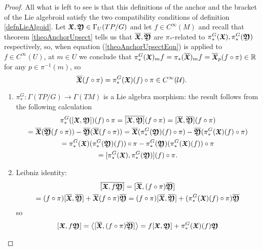 \begin{proof}
All what is left to see is that this definitions of the anchor and the bracket of the Lie algebroid satisfy the two compatibility conditions of definition \ref{defnLieAlgoid}. Let $\bm{\mathfrak{X}}, \bm{\mathfrak{Y}} \in \Gamma_U(TP/G)$ and let $f \in C^{\infty}(M)$ and recall that theorem \ref{theoAnchorUpsect} tells us that $\overline{\bm{\bm{\mathfrak{X}}}}, \overline{\bm{\bm{\mathfrak{Y}}}}$ are $\pi_*$-related to $\pi_*^G(\bm{\mathfrak{X}}), \pi_*^G(\bm{\mathfrak{Y}})$ respectively, so, when equation (\ref{theoAnchorUpsectEqn}) is applied to $f \in C^\infty(U)$, at $m\in U$ we conclude that 
    $\pi_*^G(\bm{\mathfrak{X}})_mf = \pi_*(\overline{\bm{\bm{\mathfrak{X}}}})_m f = \overline{\bm{\bm{\mathfrak{X}}}}_p(f \circ \pi) \in \mathbb{R}$ for any $p \in \pi^{-1}(m)$, so 
    \begin{equation}
        \overline{\bm{\bm{\mathfrak{X}}}}(f \circ \pi) = \pi_*^G(\bm{\mathfrak{X}})(f) \circ \pi \in C^\infty(\mathcal U).
    \end{equation}

    \begin{enumerate}
    
    \item $\pi_*^G: \Gamma(TP/G) \to \Gamma(TM)$ is a Lie algebra morphism: the result follows from the following calculation
    \begin{multline*}
        \pi_*^G([\bm{\mathfrak{X}}, \bm{\mathfrak{Y}}])(f) \circ \pi
        = \overline{[\bm{\mathfrak{X}}, \bm{\mathfrak{Y}}]}(f \circ \pi)
        = [\overline{\bm{\mathfrak{X}}}, \overline{\bm{\mathfrak{Y}}}](f \circ \pi) \\
        = \overline{\bm{\mathfrak{X}}} (\overline{\bm{\mathfrak{Y}}}(f \circ \pi)) - \overline{\bm{\mathfrak{Y}}} (\overline{\bm{\mathfrak{X}}}(f \circ \pi)) 
        = \overline{\bm{\mathfrak{X}}} (\pi_*^G(\bm{\mathfrak{Y}})(f) \circ \pi) - \overline{\bm{\mathfrak{Y}}} (\pi_*^G(\bm{\mathfrak{X}})(f) \circ \pi)\\
        = \pi_*^G(\bm{\mathfrak{X}})(\pi_*^G(\bm{\mathfrak{Y}})(f)) \circ \pi - \pi_*^G(\bm{\mathfrak{Y}})(\pi_*^G(\bm{\mathfrak{X}})(f)) \circ \pi\\
        = [\pi_*^G(\bm{\mathfrak{X}}), \pi_*^G(\bm{\mathfrak{Y}})](f) \circ \pi.
    \end{multline*}
    
    \item Leibniz identity:
    \begin{multline*}
        \overline{[\bm{\mathfrak{X}}, f \bm{\mathfrak{Y}}]} 
        =[\overline{\bm{\bm{\mathfrak{X}}}}, (f \circ \pi) \overline{\bm{\bm{\mathfrak{Y}}}}] \\
        = (f \circ \pi)[\overline{\bm{\bm{\mathfrak{X}}}}, \overline{\bm{\bm{\mathfrak{Y}}}}] + \overline{\bm{\bm{\mathfrak{X}}}}(f \circ \pi) \overline{\bm{\bm{\mathfrak{Y}}}} = 
        (f \circ \pi)[\overline{\bm{\bm{\mathfrak{X}}}}, \overline{\bm{\bm{\mathfrak{Y}}}}] + (\pi_*^G(\bm{\mathfrak{X}})(f) \circ \pi) \overline{\bm{\bm{\mathfrak{Y}}}}
    \end{multline*} so 
    \[
        [\bm{\mathfrak{X}}, f \bm{\mathfrak{Y}}] = \left\langle [\overline{\bm{\bm{\mathfrak{X}}}}, (f \circ \pi) \overline{\bm{\bm{\mathfrak{Y}}}}] \right\rangle = f[\bm{\mathfrak{X}}, \bm{\mathfrak{Y}}] + \pi_*^G(\bm{\mathfrak{X}})(f) \bm{\mathfrak{Y}}
    \]
    
    \end{enumerate}

\end{proof}

